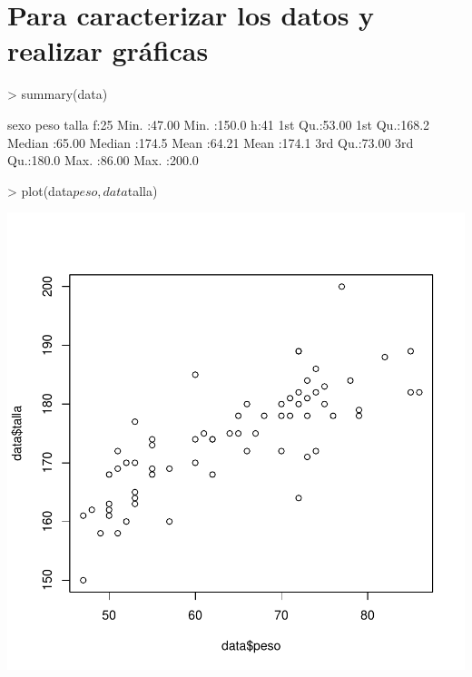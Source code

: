 \documentclass[12pt]{article}
\begin{document}
  \section*{Para caracterizar los datos y realizar gráficas}

\begin{Schunk}
\begin{Sinput}
> summary(data)
\end{Sinput}
\begin{Soutput}
 sexo        peso           talla      
 f:25   Min.   :47.00   Min.   :150.0  
 h:41   1st Qu.:53.00   1st Qu.:168.2  
        Median :65.00   Median :174.5  
        Mean   :64.21   Mean   :174.1  
        3rd Qu.:73.00   3rd Qu.:180.0  
        Max.   :86.00   Max.   :200.0  
\end{Soutput}
\end{Schunk}
  \begin{center}
\begin{Schunk}
\begin{Sinput}
> plot(data$peso, data$talla)
\end{Sinput}
\end{Schunk}
\includegraphics{ensayo-004}
  \end{center}
\end{document}
